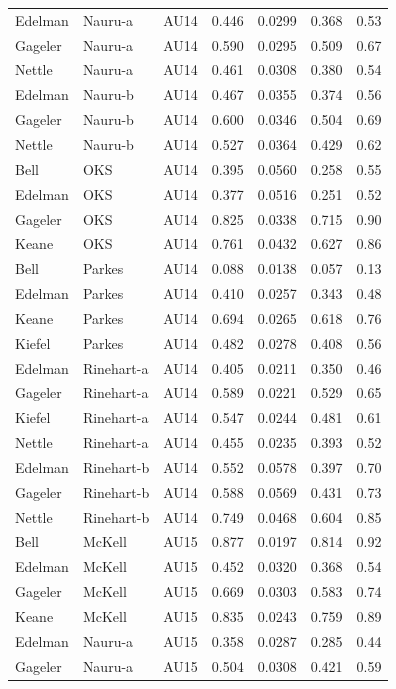 \documentclass{monashthesis}
\begin{document}
\begin{center}
\begin{longtable}{lllllll}
Edelman & Nauru-a & AU14 & 0.446 & 0.0299 & 0.368 & 0.53 \\
Gageler & Nauru-a & AU14 & 0.590 & 0.0295 & 0.509 & 0.67 \\
Nettle & Nauru-a & AU14 & 0.461 & 0.0308 & 0.380 & 0.54 \\
Edelman & Nauru-b & AU14 & 0.467 & 0.0355 & 0.374 & 0.56 \\
Gageler & Nauru-b & AU14 & 0.600 & 0.0346 & 0.504 & 0.69 \\
Nettle & Nauru-b & AU14 & 0.527 & 0.0364 & 0.429 & 0.62 \\
Bell & OKS & AU14 & 0.395 & 0.0560 & 0.258 & 0.55 \\
Edelman & OKS & AU14 & 0.377 & 0.0516 & 0.251 & 0.52 \\
Gageler & OKS & AU14 & 0.825 & 0.0338 & 0.715 & 0.90 \\
Keane & OKS & AU14 & 0.761 & 0.0432 & 0.627 & 0.86 \\
Bell & Parkes & AU14 & 0.088 & 0.0138 & 0.057 & 0.13 \\
Edelman & Parkes & AU14 & 0.410 & 0.0257 & 0.343 & 0.48 \\
Keane & Parkes & AU14 & 0.694 & 0.0265 & 0.618 & 0.76 \\
Kiefel & Parkes & AU14 & 0.482 & 0.0278 & 0.408 & 0.56 \\
Edelman & Rinehart-a & AU14 & 0.405 & 0.0211 & 0.350 & 0.46 \\
Gageler & Rinehart-a & AU14 & 0.589 & 0.0221 & 0.529 & 0.65 \\
Kiefel & Rinehart-a & AU14 & 0.547 & 0.0244 & 0.481 & 0.61 \\
Nettle & Rinehart-a & AU14 & 0.455 & 0.0235 & 0.393 & 0.52 \\
Edelman & Rinehart-b & AU14 & 0.552 & 0.0578 & 0.397 & 0.70 \\
Gageler & Rinehart-b & AU14 & 0.588 & 0.0569 & 0.431 & 0.73 \\
Nettle & Rinehart-b & AU14 & 0.749 & 0.0468 & 0.604 & 0.85 \\
Bell & McKell & AU15 & 0.877 & 0.0197 & 0.814 & 0.92 \\
Edelman & McKell & AU15 & 0.452 & 0.0320 & 0.368 & 0.54 \\
Gageler & McKell & AU15 & 0.669 & 0.0303 & 0.583 & 0.74 \\
Keane & McKell & AU15 & 0.835 & 0.0243 & 0.759 & 0.89 \\
Edelman & Nauru-a & AU15 & 0.358 & 0.0287 & 0.285 & 0.44 \\
Gageler & Nauru-a & AU15 & 0.504 & 0.0308 & 0.421 & 0.59 \\

\end{longtable}
\end{center}
\end{document}
